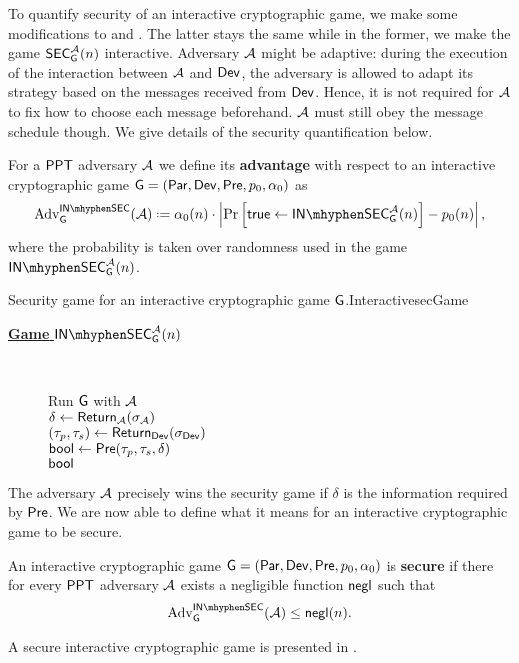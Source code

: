 To quantify security of an interactive cryptographic game, we make some modifications to  and . The latter stays the same while in the former, we make the game $\mathsf{SEC}_{\operatorname{\mathsf{G}}}^{\mathcal{A}}(n)$ interactive. Adversary $\mathcal{A}$ might be adaptive: during the execution of the interaction between $\mathcal{A}$ and $\operatorname{\mathsf{Dev}}$, the adversary is allowed to adapt its strategy based on the messages received from $\operatorname{\mathsf{Dev}}$. Hence, it is not required for $\mathcal{A}$ to  fix how to choose each message beforehand. $\mathcal{A}$ must still obey the message schedule though. We give details of the security quantification below.

\begin{defn}
	For a $\mathsf{PPT}$ adversary $\mathcal{A}$ we define its \textbf{advantage} with respect to an interactive cryptographic game $\operatorname{\mathsf{G}}=\left(\operatorname{\mathsf{Par}},\operatorname{\mathsf{Dev}},\operatorname{\mathsf{Pre}},p_{0},\alpha_{0}\right)$ as
	\begin{align*}
		\adv_{\cgame}^{\insecgame}(\adve)\defeq \secf(n)\cdot\left\vert \prob{\true \leftarrow \insecgame_{\cgame}^{\adve}(n)}-\basep(n)\right\vert,
	\end{align*}
where the probability is taken over randomness used in the game $\insecgame_{\cgame}^{\adve}(n)$.
\end{defn}

\begin{boxfigGame}{Security game for an interactive cryptographic game $\operatorname{\mathsf{G}}$.}{InteractivesecGame}
  \begin{description}
	\item[\underline{\textbf{Game} $\insecgame_{\cgame}^{\adve}(n)$}] ~
 	
 		Run $\operatorname{\mathsf{G}}$ with $\mathcal{A}$ \\
 		$\delta\leftarrow\operatorname{\mathsf{Return}}_{\mathcal{A}}(\sigma_{\mathcal{A}})$ \\
 		$(\tau_p,\tau_s)\leftarrow \operatorname{\mathsf{Return}}_{\operatorname{\mathsf{Dev}}}(\sigma_{\operatorname{\mathsf{Dev}}})$ \\
 		$\mathsf{bool} \leftarrow \operatorname{\mathsf{Pre}}(\tau_p,\tau_s,\delta)$ \\
		\Ret $\mathsf{bool}$
  \end{description}
\end{boxfigGame}

The adversary $\mathcal{A}$ precisely wins the security game if $\delta$ is the information required by $\operatorname{\mathsf{Pre}}$.  We are now able to define what it means for an interactive cryptographic game to be secure. 
\begin{defn}
	An interactive cryptographic game $\operatorname{\mathsf{G}}=\left(\operatorname{\mathsf{Par}},\operatorname{\mathsf{Dev}},\operatorname{\mathsf{Pre}},p_{0},\alpha_{0}\right)$ is \textbf{secure} if there for every $\mathsf{PPT}$ adversary $\mathcal{A}$ exists a negligible function $\operatorname{\mathsf{negl}}$ such that 
	\begin{align*}
		\adv_{\cgame}^{\insecgame}(\adve)\leq \negl(n).
	\end{align*} 
\end{defn}

A secure interactive cryptographic game is presented in . 


